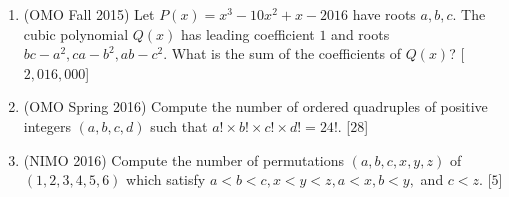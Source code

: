 \documentclass[11pt,paper=letter]{scrartcl}
\begin{document}
\begin{enumerate}
\item (OMO Fall 2015) Let $P(x) = x^3 - 10x^2 + x - 2016$ have roots $a, b, c$. The cubic polynomial $Q(x)$ has leading coefficient $1$ and roots $bc - a^2, ca - b^2, ab - c^2$. What is the sum of the coefficients of $Q(x)$? \hfill [$2,016,000$]

\item (OMO Spring 2016) Compute the number of ordered quadruples of positive integers $(a, b, c, d)$ such that $a! \times b! \times c! \times d! = 24!$. \hfill [$28$]

\item (NIMO 2016) Compute the number of permutations $(a, b, c, x, y, z)$ of $(1, 2, 3, 4, 5, 6)$ which satisfy $a < b < c, x < y < z, a < x, b < y,$ and $c < z$. \hfill [$5$]

\end{enumerate}
\end{document}
